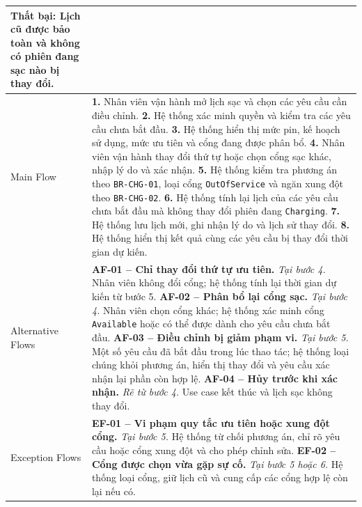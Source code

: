 \begin{longtable}{|L{42mm}|L{102mm}|}
    \textbf{Thất bại:} Lịch cũ được bảo toàn và không có phiên đang sạc nào bị thay đổi.\\\hline
  Main Flow &
    \textbf{1.} Nhân viên vận hành mở lịch sạc và chọn các yêu cầu cần điều chỉnh.\newline
    \textbf{2.} Hệ thống xác minh quyền và kiểm tra các yêu cầu chưa bắt đầu.\newline
    \textbf{3.} Hệ thống hiển thị mức pin, kế hoạch sử dụng, mức ưu tiên và cổng đang được phân bổ.\newline
    \textbf{4.} Nhân viên vận hành thay đổi thứ tự hoặc chọn cổng sạc khác, nhập lý do và xác nhận.\newline
    \textbf{5.} Hệ thống kiểm tra phương án theo \texttt{BR-CHG-01}, loại cổng \texttt{OutOfService} và ngăn xung đột theo \texttt{BR-CHG-02}.\newline
    \textbf{6.} Hệ thống tính lại lịch của các yêu cầu chưa bắt đầu mà không thay đổi phiên đang \texttt{Charging}.\newline
    \textbf{7.} Hệ thống lưu lịch mới, ghi nhận lý do và lịch sử thay đổi.\newline
    \textbf{8.} Hệ thống hiển thị kết quả cùng các yêu cầu bị thay đổi thời gian dự kiến.\\\hline
  Alternative Flows &
    \textbf{AF-01 -- Chỉ thay đổi thứ tự ưu tiên.} \textit{Tại bước 4.} Nhân viên không đổi cổng; hệ thống tính lại thời gian dự kiến từ bước 5.\newline
    \textbf{AF-02 -- Phân bổ lại cổng sạc.} \textit{Tại bước 4.} Nhân viên chọn cổng khác; hệ thống xác minh cổng \texttt{Available} hoặc có thể được dành cho yêu cầu chưa bắt đầu.\newline
    \textbf{AF-03 -- Điều chỉnh bị giảm phạm vi.} \textit{Tại bước 5.} Một số yêu cầu đã bắt đầu trong lúc thao tác; hệ thống loại chúng khỏi phương án, hiển thị thay đổi và yêu cầu xác nhận lại phần còn hợp lệ.\newline
    \textbf{AF-04 -- Hủy trước khi xác nhận.} \textit{Rẽ từ bước 4.} Use case kết thúc và lịch sạc không thay đổi.\\\hline
  Exception Flows &
    \textbf{EF-01 -- Vi phạm quy tắc ưu tiên hoặc xung đột cổng.} \textit{Tại bước 5.} Hệ thống từ chối phương án, chỉ rõ yêu cầu hoặc cổng xung đột và cho phép chỉnh sửa.\newline
    \textbf{EF-02 -- Cổng được chọn vừa gặp sự cố.} \textit{Tại bước 5 hoặc 6.} Hệ thống loại cổng, giữ lịch cũ và cung cấp các cổng hợp lệ còn lại nếu có.\newline

\end{longtable}
